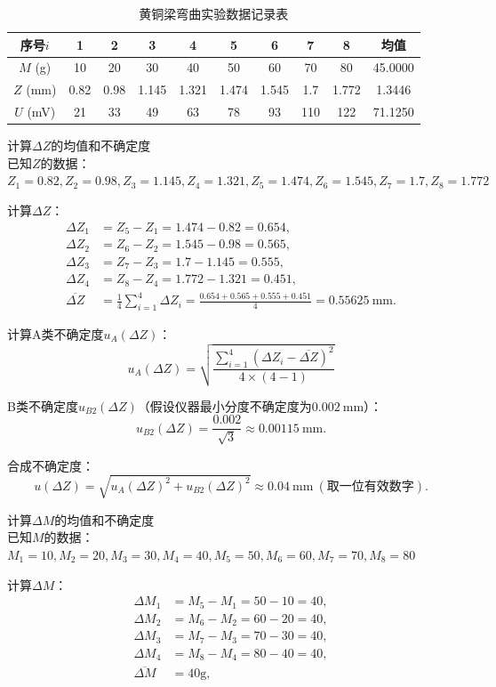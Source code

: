 \documentclass[11pt]{article}
\begin{document}
\begin{enumerate}
\begin{table}[htbp]
  \centering
  \caption{黄铜梁弯曲实验数据记录表}
    \vspace{0.5em}
  \begin{tabular}{c c c c c c c c c c}
    \toprule
    序号$i$ & 1 & 2 & 3 & 4 & 5 & 6 & 7 & 8 & 均值 \\
    \midrule
    $M$ (g) & 10 & 20 & 30 & 40 & 50 & 60 & 70 & 80 & 45.0000 \\
    $Z$ (mm) & 0.82 & 0.98 & 1.145 & 1.321 & 1.474 & 1.545 & 1.7 & 1.772 & 1.3446 \\
    $U$ (mV) & 21 & 33 & 49 & 63 & 78 & 93 & 110 & 122 & 71.1250 \\
    \bottomrule
  \end{tabular}
  \label{tab:measurement_data}
\end{table}
计算\(\Delta Z\)的均值和不确定度 \\
已知\(Z\)的数据：\(Z_1=0.82, Z_2=0.98, Z_3=1.145, Z_4=1.321, Z_5=1.474, Z_6=1.545, Z_7=1.7, Z_8=1.772\)

计算\(\Delta Z\)：
\begin{align*}
\Delta Z_1 &= Z_5 - Z_1 = 1.474 - 0.82 = 0.654, \\
\Delta Z_2 &= Z_6 - Z_2 = 1.545 - 0.98 = 0.565, \\
\Delta Z_3 &= Z_7 - Z_3 = 1.7 - 1.145 = 0.555, \\
\Delta Z_4 &= Z_8 - Z_4 = 1.772 - 1.321 = 0.451, \\
\overline{\Delta Z} &= \frac{1}{4}\sum_{i=1}^{4} \Delta Z_i = \frac{0.654 + 0.565 + 0.555 + 0.451}{4} = 0.55625\ \text{mm}.
\end{align*}

计算A类不确定度\(u_A(\Delta Z)\)：
\[
u_A(\Delta Z) = \sqrt{\frac{\sum_{i=1}^{4} (\Delta Z_i - \overline{\Delta Z})^2}{4 \times (4 - 1)}} 
\]

B类不确定度\(u_{B2}(\Delta Z)\)（假设仪器最小分度不确定度为\(0.002\ \text{mm}\)）：
\[
u_{B2}(\Delta Z) = \frac{0.002}{\sqrt{3}} \approx 0.00115\ \text{mm}.
\]

合成不确定度：
\[
u(\Delta Z) = \sqrt{u_A(\Delta Z)^2 + u_{B2}(\Delta Z)^2} \approx 0.04\ \text{mm}\ (\text{取一位有效数字}).
\]


计算\(\Delta M\)的均值和不确定度 \\
已知\(M\)的数据：\(M_1=10, M_2=20, M_3=30, M_4=40, M_5=50, M_6=60, M_7=70, M_8=80\)

计算\(\Delta M\)：
\begin{align*}
\Delta M_1 &= M_5 - M_1 = 50 - 10 = 40, \\
\Delta M_2 &= M_6 - M_2 = 60 - 20 = 40, \\
\Delta M_3 &= M_7 - M_3 = 70 - 30 = 40, \\
\Delta M_4 &= M_8 - M_4 = 80 - 40 = 40, \\
\overline{\Delta M} &= 40 \text{g},
\end{align*}


\end{enumerate}
\end{document}
